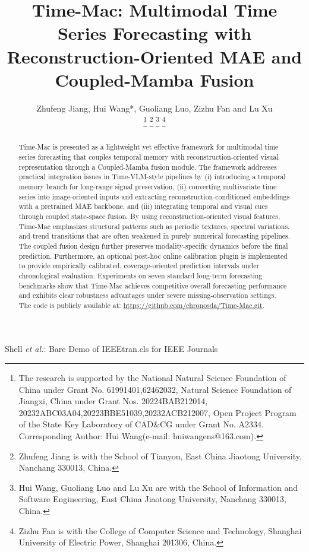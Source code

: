\documentclass[journal]{IEEEtran}
\begin{document}
\title{Time-Mac: Multimodal Time Series Forecasting with Reconstruction-Oriented MAE and Coupled-Mamba Fusion}

\author{Zhufeng Jiang, Hui Wang*, Guoliang Luo, Zizhu Fan and Lu Xu

\thanks{The research is supported by the National Natural Science Foundation of China under Grant No. 61991401,62462032, Natural Science Foundation of Jiangxi, China under Grant Nos. 20224BAB212014, 20232ABC03A04,20223BBE51039,20232ACB212007, Open Project Program of the State Key Laboratory of CAD\&CG under Grant No. A2334. Corresponding Author: Hui Wang(e-mail: huiwangens@163.com).}
\thanks{Zhufeng Jiang is with the School of Tianyou, East China Jiaotong University, Nanchang 330013, China.}
\thanks{Hui Wang, Guoliang Luo and Lu Xu are with the School of Information and Software Engineering, East China Jiaotong University, Nanchang 330013, China.}
\thanks{Zizhu Fan is with the College of Computer Science and Technology, Shanghai University of Electric Power, Shanghai 201306, China.}}

{Shell \MakeLowercase{\textit{et al.}}: Bare Demo of IEEEtran.cls for IEEE Journals}
\maketitle

\begin{abstract}
Time-Mac is presented as a lightweight yet effective framework for multimodal time series forecasting that couples temporal memory with reconstruction-oriented visual representation through a Coupled-Mamba fusion module. The framework addresses practical integration issues in Time-VLM-style pipelines by (i) introducing a temporal memory branch for long-range signal preservation, (ii) converting multivariate time series into image-oriented inputs and extracting reconstruction-conditioned embeddings with a pretrained MAE backbone, and (iii) integrating temporal and visual cues through coupled state-space fusion. By using reconstruction-oriented visual features, Time-Mac emphasizes structural patterns such as periodic textures, spectral variations, and trend transitions that are often weakened in purely numerical forecasting pipelines. The coupled fusion design further preserves modality-specific dynamics before the final prediction. Furthermore, an optional post-hoc online calibration plugin is implemented to provide empirically calibrated, coverage-oriented prediction intervals under chronological evaluation. Experiments on seven standard long-term forecasting benchmarks show that Time-Mac achieves competitive overall forecasting performance and exhibits clear robustness advantages under severe missing-observation settings. The code is publicly available at: \url{https://github.com/chronosda/Time-Mac.git}.
\end{abstract}
\end{document}
